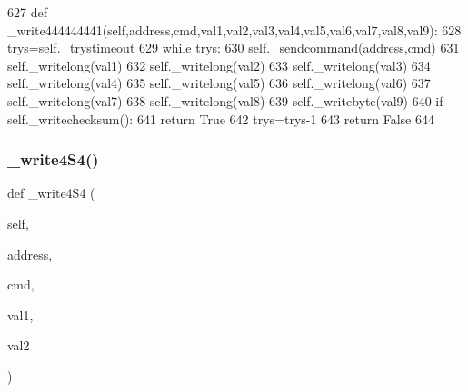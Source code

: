 \begin{DoxyCode}
627     \textcolor{keyword}{def }\_write444444441(self,address,cmd,val1,val2,val3,val4,val5,val6,val7,val8,val9):
628         trys=self.\_trystimeout
629         \textcolor{keywordflow}{while} trys:
630             self.\_sendcommand(address,cmd)
631             self.\_writelong(val1)
632             self.\_writelong(val2)
633             self.\_writelong(val3)
634             self.\_writelong(val4)
635             self.\_writelong(val5)
636             self.\_writelong(val6)
637             self.\_writelong(val7)
638             self.\_writelong(val8)
639             self.\_writebyte(val9)
640             \textcolor{keywordflow}{if} self.\_writechecksum():
641                 \textcolor{keywordflow}{return} \textcolor{keyword}{True}
642             trys=trys-1
643         \textcolor{keywordflow}{return} \textcolor{keyword}{False}
644 
\end{DoxyCode}
\mbox{\label{classtoxic__hardware_1_1roboclaw__3_1_1Roboclaw_a605ee94779f3b9b2b6a940f418379c19}} 
\subsubsection{\texorpdfstring{\+\_\+write4\+S4()}{\_write4S4()}}
{\footnotesize\ttfamily def \+\_\+write4\+S4 (\begin{DoxyParamCaption}\item[{}]{self,  }\item[{}]{address,  }\item[{}]{cmd,  }\item[{}]{val1,  }\item[{}]{val2 }\end{DoxyParamCaption})\hspace{0.3cm}{\ttfamily [private]}}


